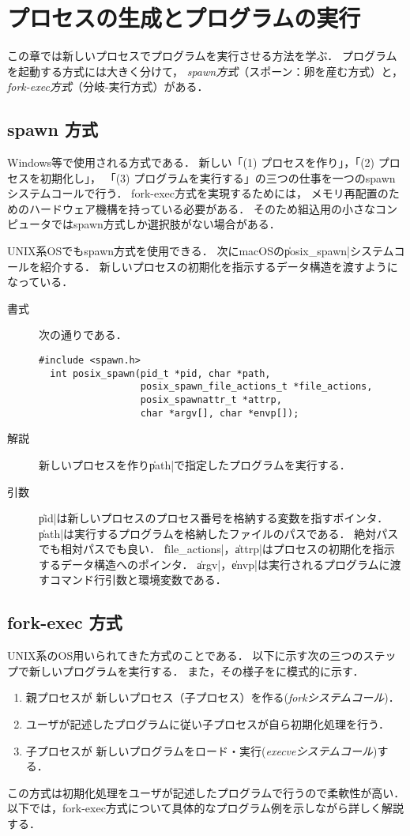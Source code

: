 \chapter{プロセスの生成とプログラムの実行}
この章では新しいプロセスでプログラムを実行させる方法を学ぶ．
プログラムを起動する方式には大きく分けて，
\emph{spawn方式}（スポーン：卵を産む方式）と，
\emph{fork-exec方式}（分岐-実行方式）がある．

\section{spawn 方式}
Windows等で使用される方式である．
新しい「(1) プロセスを作り」，「(2) プロセスを初期化し」，
「(3) プログラムを実行する」の三つの仕事を一つのspawnシステムコールで行う．
fork-exec方式を実現するためには，
メモリ再配置のためのハードウェア機構を持っている必要がある．
そのため組込用の小さなコンピュータではspawn方式しか選択肢がない場合がある．

UNIX系OSでもspawn方式を使用できる．
次にmacOSの\|posix_spawn|システムコールを紹介する．
新しいプロセスの初期化を指示するデータ構造を渡すようになっている．

\begin{description}
\item[書式] 次の通りである．
\begin{lstlisting}[numbers=none]
  #include <spawn.h>
  int posix_spawn(pid_t *pid, char *path,
                  posix_spawn_file_actions_t *file_actions,
                  posix_spawnattr_t *attrp,
                  char *argv[], char *envp[]);
\end{lstlisting}

\item[解説]
  新しいプロセスを作り\|path|で指定したプログラムを実行する．

\item[引数]
  \|pid|は新しいプロセスのプロセス番号を格納する変数を指すポインタ．
  \|path|は実行するプログラムを格納したファイルのパスである．
  絶対パスでも相対パスでも良い．
  \|file_actions|，\|attrp|はプロセスの初期化を指示するデータ構造へのポインタ．
  \|argv|，\|envp|は実行されるプログラムに渡すコマンド行引数と環境変数である．
\end{description}

\section{fork-exec 方式}
UNIX系のOS用いられてきた方式のことである．
以下に示す次の三つのステップで新しいプログラムを実行する．
また，その様子をに模式的に示す．
\begin{enumerate}
\item 親プロセスが
  新しいプロセス（子プロセス）を作る(\emph{forkシステムコール})．
\item ユーザが記述したプログラムに従い子プロセスが自ら初期化処理を行う．
\item 子プロセスが
  新しいプログラムをロード・実行(\emph{execveシステムコール})する．
\end{enumerate}
この方式は初期化処理をユーザが記述したプログラムで行うので柔軟性が高い．
以下では，fork-exec方式について具体的なプログラム例を示しながら詳しく解説する．

